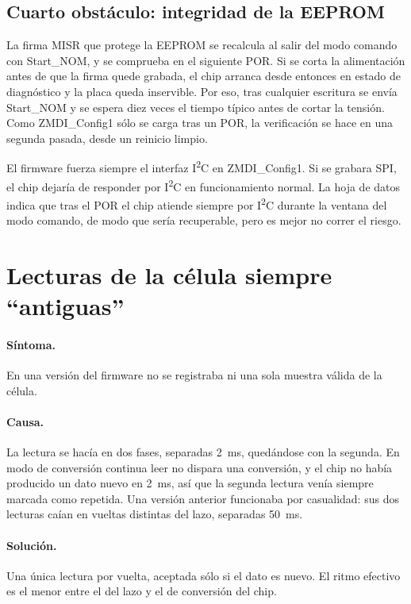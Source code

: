 \subsection{Cuarto obstáculo: integridad de la EEPROM}

La firma MISR que protege la EEPROM se recalcula al salir del modo comando con Start\_NOM, y se
comprueba en el siguiente POR. Si se corta la alimentación antes de que la firma quede grabada, el chip
arranca desde entonces en estado de diagnóstico y la placa queda inservible. Por eso, tras cualquier
escritura se envía Start\_NOM y se espera diez veces el tiempo típico antes de cortar la tensión. Como
ZMDI\_Config1 sólo se carga tras un POR, la verificación se hace en una segunda pasada, desde un
reinicio limpio.

El firmware fuerza siempre el interfaz I\textsuperscript{2}C en ZMDI\_Config1. Si se grabara SPI, el
chip dejaría de responder por I\textsuperscript{2}C en funcionamiento normal. La hoja de datos indica
que tras el POR el chip atiende siempre por I\textsuperscript{2}C durante la ventana del modo comando,
de modo que sería recuperable, pero es mejor no correr el riesgo.

\section{Lecturas de la célula siempre ``antiguas''}

\paragraph{Síntoma.} En una versión del firmware no se registraba ni una sola muestra válida de la
célula.

\paragraph{Causa.} La lectura se hacía en dos fases, separadas \SI{2}{\milli\second}, quedándose con
la segunda. En modo de conversión continua leer no dispara una conversión, y el chip no había
producido un dato nuevo en \SI{2}{\milli\second}, así que la segunda lectura venía siempre marcada como
repetida. Una versión anterior funcionaba por casualidad: sus dos lecturas caían en vueltas distintas
del lazo, separadas \SI{50}{\milli\second}.

\paragraph{Solución.} Una única lectura por vuelta, aceptada sólo si el dato es nuevo. El ritmo
efectivo es el menor entre el del lazo y el de conversión del chip.

